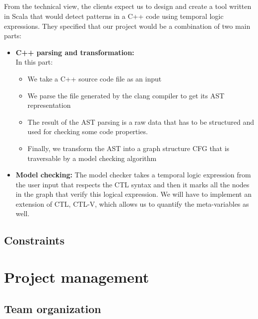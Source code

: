 \documentclass{report}
\begin{document}
\paragraph{}
\hspace{4mm}\textnormal{From the technical view, the clients expect us to design and create 
a tool written in Scala that would detect patterns in a C++ code
 using temporal logic expressions. They specified that our project 
would be a combination of two main parts:}

\vspace{3mm}
\begin{itemize}
\item \textbf{C++ parsing and transformation:}
\\
In this part:
\begin{itemize}
 \item We take a C++ source code file as an
 input
\item We parse the file generated by the clang compiler to get its 
AST representation
\item The result of the AST parsing is a raw data
 that has to be structured and used for checking some code properties.
 \item Finally, we transform the AST into a graph structure CFG that is 
traversable by a model checking algorithm
\end{itemize}\vspace{1mm}
\item \textbf{Model checking:} The model checker takes a temporal
 logic expression from the user input that respects the CTL
 syntax and then it marks all the nodes in the graph that verify this
 logical expression. We will have to implement an extension of 
CTL, CTL-V, which allows us to quantify the meta-variables as well.\vspace{1mm}
\end{itemize}

\section{Constraints}

\chapter{Project management}

\section{Team organization}
\end{document}
